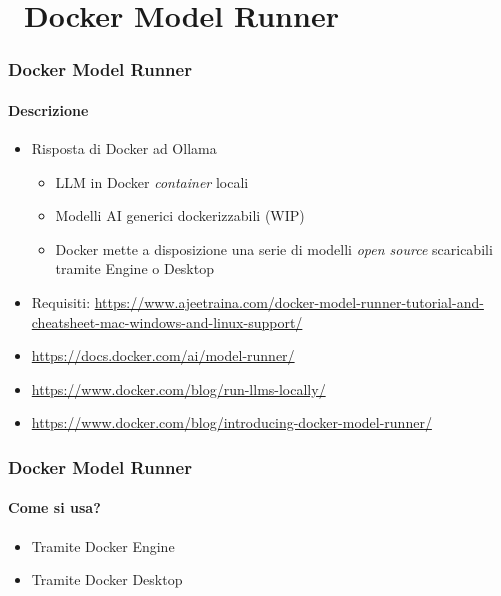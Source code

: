 \section{\faWrench\ Docker Model Runner} %
\label{sec:spring-ai-project-setup}
%
\begin{frame}[t,fragile] \frametitle{Docker Model Runner}
    \framesubtitle{Descrizione}
    \begin{itemize}[leftmargin=10pt,align=right]
        \item[\alert{\faArrowCircleRight}] Risposta di Docker ad Ollama
        \begin{itemize}[leftmargin=10pt,align=right]
            \item[\alert{\faArrowCircleRight}] LLM in Docker \textit{container} locali
            \item[\alert{\faArrowCircleRight}] Modelli AI generici dockerizzabili (WIP)
            \item[\alert{\faArrowCircleRight}] Docker mette a disposizione una serie di modelli \textit{open source} scaricabili tramite Engine o Desktop
        \end{itemize}

        \item[\alert{\faArrowCircleRight}] Requisiti: {\footnotesize \url{https://www.ajeetraina.com/docker-model-runner-tutorial-and-cheatsheet-mac-windows-and-linux-support/}}

    \item[\alert{\faExternalLink}] {\footnotesize \url{https://docs.docker.com/ai/model-runner/}}
    \item[\alert{\faExternalLink}] {\footnotesize \url{https://www.docker.com/blog/run-llms-locally/}}
    \item[\alert{\faExternalLink}] {\footnotesize \url{https://www.docker.com/blog/introducing-docker-model-runner/}}
    \end{itemize}
\end{frame}
%
\begin{frame}[t,fragile] \frametitle{Docker Model Runner}
    \framesubtitle{Come si usa?}
    \begin{itemize}[leftmargin=10pt,align=right]
        \item[\alert{\faArrowCircleRight}] Tramite Docker Engine
        \item[\alert{\faArrowCircleRight}] Tramite Docker Desktop
    \end{itemize}
\end{frame}
